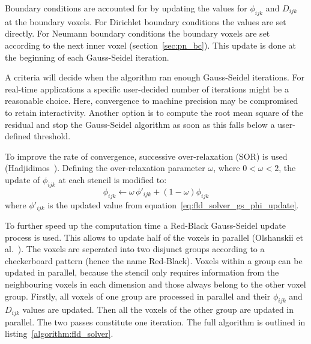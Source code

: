 Boundary conditions are accounted for by updating the values for $\phi_{ijk}$ and $D_{ijk}$ at the boundary voxels. For Dirichlet boundary conditions the values are set directly. For Neumann boundary conditions the boundary voxels are set according to the next inner voxel (section~\ref{sec:pn_bc}). This update is done at the beginning of each Gauss-Seidel iteration.

A criteria will decide when the algorithm ran enough Gauss-Seidel iterations. For real-time applications a specific user-decided number of iterations might be a reasonable choice. Here, convergence to machine precision may be compromised to retain interactivity. Another option is to compute the root mean square of the residual and stop the Gauss-Seidel algorithm as soon as this falls below a user-defined threshold.

To improve the rate of convergence, successive over-relaxation (SOR) is used (Hadjidimos~\cite{Hadjidimos00}). Defining the over-relaxation parameter $\omega$, where $0<\omega<2$, the update of $\phi_{ijk}$ at each stencil is modified to:
\begin{equation}
\label{eq:fld_solver_sor_update}
\phi_{ijk} \leftarrow \omega \,\phi'_{ijk} + (1-\omega)\phi_{ijk} 
\end{equation}
where $\phi'_{ijk}$ is the updated value from equation~\ref{eq:fld_solver_gs_phi_update}.

To further speed up the computation time a Red-Black Gauss-Seidel update process is used. This allows to update half of the voxels in parallel (Olshanskii et al.~\cite{Olshanskii14}). The voxels are seperated into two disjunct groups according to a checkerboard pattern (hence the name Red-Black). Voxels within a group can be updated in parallel, because the stencil only requires information from the neighbouring voxels in each dimension and those always belong to the other voxel group. Firstly, all voxels of one group are processed in parallel and their $\phi_{ijk}$ and $D_{ijk}$ values are updated. Then all the voxels of the other group are updated in parallel. The two passes constitute one iteration. The full algorithm is outlined in listing~\ref{algorithm:fld_solver}.



